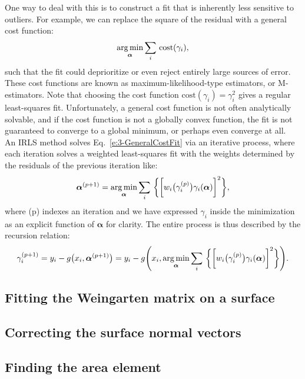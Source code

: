 One way to deal with this is to construct a fit that is inherently less sensitive to outliers.
For example, we can replace the square of the residual with a general cost function:
\begin{equation}
  \operatorname*{arg\,min}_{\bm{\alpha}} \sum\limits_i\,\textrm{cost}(\gamma_i),\label{e:3-GeneralCostFit}
\end{equation}
such that the fit could deprioritize or even reject entirely large sources of error.
These cost functions are known as maximum-likelihood-type estimators, or M-estimators.
Note that choosing the cost function $\textrm{cost}(\gamma_i) = \gamma_i^2$ gives a regular least-squares fit.
Unfortunately, a general cost function is not often analytically solvable, and if the cost function is not a globally convex function, the fit is not guaranteed to converge to a global minimum, or perhaps even converge at all.\\

An IRLS method solves Eq.~\ref{e:3-GeneralCostFit} via an iterative process, where each iteration solves a weighted least-squares fit with the weights determined by the residuals of the previous iteration like:
\begin{equation}
  \bm{\alpha}^{(p+1)} = \operatorname*{arg\,min}_{\bm{\alpha}} \sum\limits_i\,\bigg \{ \bigg [w_i \big(\gamma_i^{(p)}\big ) \gamma_i(\bm{\alpha}) \bigg ]^2 \bigg \},
\end{equation}
where (p) indexes an iteration and we have expressed $\gamma_i$ inside the minimization as an explicit function of $\bm{\alpha}$ for clarity.
The entire process is thus described by the recursion relation:
\begin{equation}
  \gamma_i^{(p+1)} = y_i - g\big (x_i,\bm{\alpha}^{(p+1)}\big )= y_i - g\Bigg (x_i, \operatorname*{arg\,min}_{\bm{\alpha}} \sum\limits_i\,\bigg \{ \bigg [w_i \big(\gamma_i^{(p)}\big ) \gamma_i(\bm{\alpha}) \bigg ]^2 \bigg \} \Bigg).
\end{equation}


\subsection{Fitting the Weingarten matrix on a surface}
\subsection{Correcting the surface normal vectors}
\subsection{Finding the area element}
